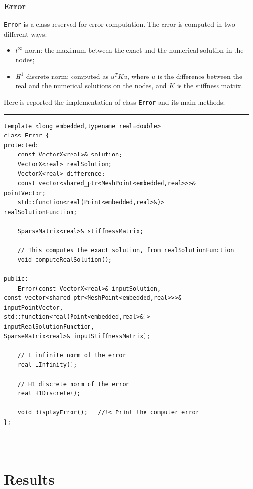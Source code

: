 \subsubsection{Error}
\verb|Error| is a class reserved for error computation. The error is computed in two different ways:
\begin{itemize}
\item $l^\infty$ norm: the maximum between the exact and the numerical solution in the nodes;
\item $H^1$ discrete norm: computed as $u^TKu$, where $u$ is the difference between the real and the numerical solutions on the nodes, and $K$ is the stiffness matrix. 
\end{itemize}

Here is reported the implementation of class \verb|Error| and its main methods:

\noindent\rule{16cm}{1pt}
\begin{lstlisting}[caption=File \texttt{Error.h}]
template <long embedded,typename real=double>
class Error {
protected:
    const VectorX<real>& solution;
    VectorX<real> realSolution;
    VectorX<real> difference;
    const vector<shared_ptr<MeshPoint<embedded,real>>>& 
pointVector;
    std::function<real(Point<embedded,real>&)> 
realSolutionFunction;
	
    SparseMatrix<real>& stiffnessMatrix;
	
    // This computes the exact solution, from realSolutionFunction
    void computeRealSolution(); 
	
public:
    Error(const VectorX<real>& inputSolution,
const vector<shared_ptr<MeshPoint<embedded,real>>>& 
inputPointVector,
std::function<real(Point<embedded,real>&)> 
inputRealSolutionFunction,
SparseMatrix<real>& inputStiffnessMatrix);

    // L infinite norm of the error
    real LInfinity();
	
    // H1 discrete norm of the error
    real H1Discrete();
	
    void displayError();   //!< Print the computer error	
};
\end{lstlisting}
\noindent\rule{16cm}{1pt}\\

\newpage
\section{Results}\label{results}


